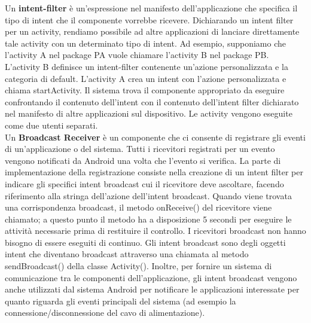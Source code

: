 Un \textbf{intent-filter} è un'espressione nel manifesto dell'applicazione che specifica il tipo di intent che il componente vorrebbe ricevere. Dichiarando un intent filter per un activity, rendiamo possibile ad altre applicazioni di lanciare direttamente tale activity con un determinato tipo di intent. Ad esempio, supponiamo che l'activity A nel package PA vuole chiamare l'activity B nel package PB. L'activity B definisce un intent-filter contenente un'azione personalizzata e la categoria di default. L'activity A crea un intent con l'azione personalizzata e chiama startActivity. Il sistema trova il componente appropriato da eseguire confrontando il contenuto dell'intent con il contenuto dell'intent filter dichiarato nel manifesto di altre applicazioni sul dispositivo. Le activity vengono eseguite come due utenti separati.\\Un \textbf{Broadcast Receiver} è un componente che ci consente di registrare gli eventi di un'applicazione o del sistema. Tutti i ricevitori registrati per un evento vengono notificati da Android una volta che l'evento si verifica. La parte di implementazione della registrazione consiste nella creazione di un intent filter per indicare gli specifici intent broadcast cui il ricevitore deve ascoltare, facendo riferimento alla stringa dell'azione dell'intent broadcast. Quando viene trovata una corrispondenza broadcast, il metodo onReceive() del ricevitore viene chiamato; a questo punto il metodo ha a disposizione 5 secondi per eseguire le attività necessarie prima di restituire il controllo. I ricevitori broadcast non hanno bisogno di essere eseguiti di continuo. Gli intent broadcast sono degli oggetti intent che diventano broadcast attraverso una chiamata al metodo sendBroadcast() della classe Activity(). Inoltre, per fornire un sistema di comunicazione tra le componenti dell'applicazione, gli intent broadcast vengono anche utilizzati dal sistema Android per notificare le applicazioni interessate per quanto riguarda gli eventi principali del sistema (ad esempio la connessione/disconnessione del cavo di alimentazione).
